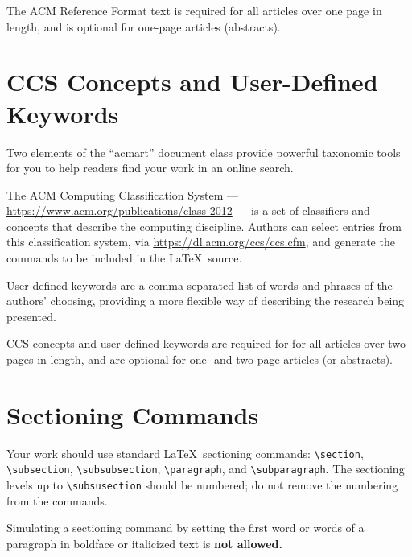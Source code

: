 \documentclass[manuscript,screen,review]{acmart}
\begin{document}
The ACM Reference Format text is required for all articles over one
page in length, and is optional for one-page articles (abstracts).

\section{CCS Concepts and User-Defined Keywords}

Two elements of the ``acmart'' document class provide powerful
taxonomic tools for you to help readers find your work in an online
search.

The ACM Computing Classification System ---
\url{https://www.acm.org/publications/class-2012} --- is a set of
classifiers and concepts that describe the computing
discipline. Authors can select entries from this classification
system, via \url{https://dl.acm.org/ccs/ccs.cfm}, and generate the
commands to be included in the \LaTeX\ source.

User-defined keywords are a comma-separated list of words and phrases
of the authors' choosing, providing a more flexible way of describing
the research being presented.

CCS concepts and user-defined keywords are required for for all
articles over two pages in length, and are optional for one- and
two-page articles (or abstracts).

\section{Sectioning Commands}

Your work should use standard \LaTeX\ sectioning commands:
\verb|\section|, \verb|\subsection|, \verb|\subsubsection|,
\verb|\paragraph|, and \verb|\subparagraph|. The sectioning levels up to
\verb|\subsusection| should be numbered; do not remove the numbering
from the commands.

Simulating a sectioning command by setting the first word or words of
a paragraph in boldface or italicized text is {\bfseries not allowed.}
\end{document}
